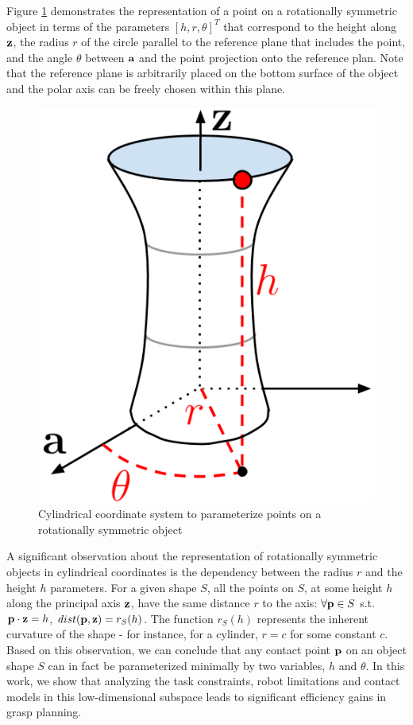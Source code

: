 \documentclass{aamas2015}
\begin{document}
Figure \ref{fig:representation} demonstrates the representation
of a point on a rotationally symmetric object in terms of the parameters $[h, r, \theta]^T$
that correspond to the height along $\textbf{z}$, the radius $r$ of the circle parallel to the
reference plane that includes the point, and the angle $\theta$ between $\textbf{a}$ and the point
projection onto the reference plan. Note that the reference plane is arbitrarily placed 
on the bottom surface of the object and the polar axis can be freely chosen within this plane. 

\begin{figure}[t]
  \begin{center}
    \includegraphics[width=0.5\linewidth]{./images/representation.png} \quad 
  \end{center}
  \caption{Cylindrical coordinate system to parameterize points on a rotationally symmetric object}
  \label{fig:representation}
\end{figure}

\newpage

A significant observation about the representation of rotationally symmetric objects in cylindrical
coordinates is the dependency between the radius $r$ and the height $h$ parameters. For a given shape $S$,
all the points on $S$, at some height $h$ along the principal axis $\textbf{z}$, have the same distance
$r$ to the axis: $\forall \textbf{p} \in S$ s.t. $\textbf{p} \cdot \textbf{z} = h$, $dist(\textbf{p}, \textbf{z}) = r_S(h)$. The
function $r_S(h)$ represents the inherent curvature of the shape - for instance, for a cylinder, $r
= c$ for some constant $c$. Based on this observation, we can conclude that any contact point $\textbf{p}$ on
an object shape $S$ can in fact be parameterized minimally by two variables, $h$ and $\theta$.
In this work, we show that analyzing the task constraints, robot limitations and contact models 
in this low-dimensional subspace leads to significant efficiency gains in grasp planning.
\end{document}
